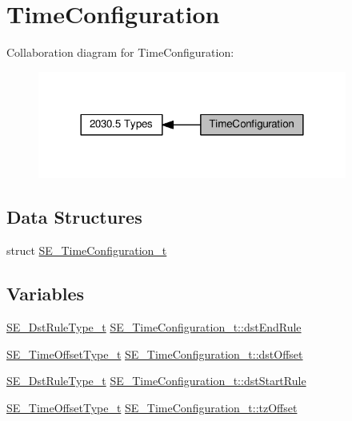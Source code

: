\hypertarget{group__TimeConfiguration}{}\section{Time\+Configuration}
\label{group__TimeConfiguration}
Collaboration diagram for Time\+Configuration\+:\nopagebreak
\begin{figure}[H]
\begin{center}
\leavevmode
\includegraphics[width=288pt]{group__TimeConfiguration}
\end{center}
\end{figure}
\subsection*{Data Structures}
\begin{DoxyCompactItemize}
\item 
struct \hyperlink{structSE__TimeConfiguration__t}{S\+E\+\_\+\+Time\+Configuration\+\_\+t}
\end{DoxyCompactItemize}
\subsection*{Variables}
\begin{DoxyCompactItemize}
\item 
\hyperlink{group__DstRuleType_ga215f3da52e2c5be95bc85b60e8702bcf}{S\+E\+\_\+\+Dst\+Rule\+Type\+\_\+t} \hyperlink{group__TimeConfiguration_gae87e7c6824261a50cda64560ae33fa4b}{S\+E\+\_\+\+Time\+Configuration\+\_\+t\+::dst\+End\+Rule}
\item 
\hyperlink{group__TimeOffsetType_ga3de71705a6723a1013cf383b705cbd8a}{S\+E\+\_\+\+Time\+Offset\+Type\+\_\+t} \hyperlink{group__TimeConfiguration_ga3bb6651aeebc25b17fbcd004bb0a5ffc}{S\+E\+\_\+\+Time\+Configuration\+\_\+t\+::dst\+Offset}
\item 
\hyperlink{group__DstRuleType_ga215f3da52e2c5be95bc85b60e8702bcf}{S\+E\+\_\+\+Dst\+Rule\+Type\+\_\+t} \hyperlink{group__TimeConfiguration_gaa5bec33fb7f397915e1c59e039876bb0}{S\+E\+\_\+\+Time\+Configuration\+\_\+t\+::dst\+Start\+Rule}
\item 
\hyperlink{group__TimeOffsetType_ga3de71705a6723a1013cf383b705cbd8a}{S\+E\+\_\+\+Time\+Offset\+Type\+\_\+t} \hyperlink{group__TimeConfiguration_ga2828faf061be8b3195d89dfbf7cb2b02}{S\+E\+\_\+\+Time\+Configuration\+\_\+t\+::tz\+Offset}
\end{DoxyCompactItemize}


